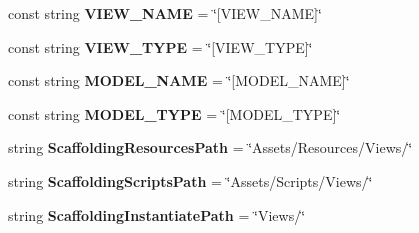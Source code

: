 \begin{DoxyCompactItemize}
\item 
\hypertarget{class_scaffolding_1_1_scaffolding_config_ae0bd7ace4e879759b228509372956b17}{const string {\bfseries V\+I\+E\+W\+\_\+\+N\+A\+M\+E} = \char`\"{}\mbox{[}V\+I\+E\+W\+\_\+\+N\+A\+M\+E\mbox{]}\char`\"{}}\label{class_scaffolding_1_1_scaffolding_config_ae0bd7ace4e879759b228509372956b17}

\item 
\hypertarget{class_scaffolding_1_1_scaffolding_config_a59baee34106272850a7db39b4d6681f4}{const string {\bfseries V\+I\+E\+W\+\_\+\+T\+Y\+P\+E} = \char`\"{}\mbox{[}V\+I\+E\+W\+\_\+\+T\+Y\+P\+E\mbox{]}\char`\"{}}\label{class_scaffolding_1_1_scaffolding_config_a59baee34106272850a7db39b4d6681f4}

\item 
\hypertarget{class_scaffolding_1_1_scaffolding_config_a505921423404d3d4570ba3c4244f85e6}{const string {\bfseries M\+O\+D\+E\+L\+\_\+\+N\+A\+M\+E} = \char`\"{}\mbox{[}M\+O\+D\+E\+L\+\_\+\+N\+A\+M\+E\mbox{]}\char`\"{}}\label{class_scaffolding_1_1_scaffolding_config_a505921423404d3d4570ba3c4244f85e6}

\item 
\hypertarget{class_scaffolding_1_1_scaffolding_config_a7f9a3fa7709f53665a4ec613d2ce73f5}{const string {\bfseries M\+O\+D\+E\+L\+\_\+\+T\+Y\+P\+E} = \char`\"{}\mbox{[}M\+O\+D\+E\+L\+\_\+\+T\+Y\+P\+E\mbox{]}\char`\"{}}\label{class_scaffolding_1_1_scaffolding_config_a7f9a3fa7709f53665a4ec613d2ce73f5}

\item 
\hypertarget{class_scaffolding_1_1_scaffolding_config_a9509e163f79e9cd9fc66b571f47af5c6}{string {\bfseries Scaffolding\+Resources\+Path} = \char`\"{}Assets/Resources/Views/\char`\"{}}\label{class_scaffolding_1_1_scaffolding_config_a9509e163f79e9cd9fc66b571f47af5c6}

\item 
\hypertarget{class_scaffolding_1_1_scaffolding_config_af399dc5b33f5bba471e5caf13b1eeda1}{string {\bfseries Scaffolding\+Scripts\+Path} = \char`\"{}Assets/Scripts/Views/\char`\"{}}\label{class_scaffolding_1_1_scaffolding_config_af399dc5b33f5bba471e5caf13b1eeda1}

\item 
\hypertarget{class_scaffolding_1_1_scaffolding_config_a22bd85373e437aab80656173c4c5a3b0}{string {\bfseries Scaffolding\+Instantiate\+Path} = \char`\"{}Views/\char`\"{}}\label{class_scaffolding_1_1_scaffolding_config_a22bd85373e437aab80656173c4c5a3b0}


\end{DoxyCompactItemize}
